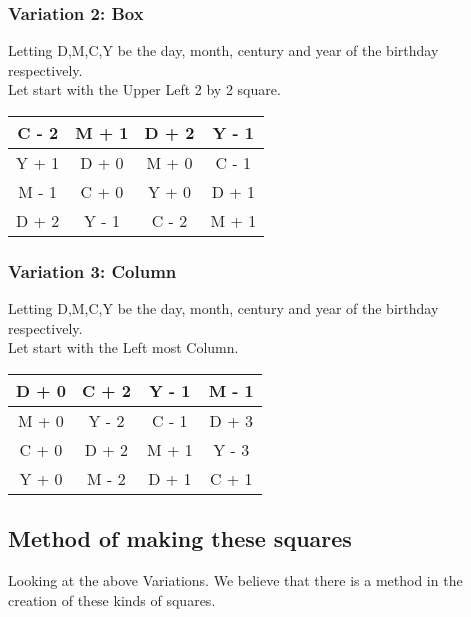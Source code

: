 \documentclass{article}
\begin{document}
    \subsubsection{Variation 2: Box}
        Letting D,M,C,Y be the day, month, century and year of the birthday respectively. \\
        Let start with the Upper Left 2 by 2 square. \\
        \def\arraystretch{2}
        \begin{center}
            \begin{tabular}{|c|c|c|c|}
                \hline
                C - 2 & M + 1 & D + 2 & Y - 1 \\
                \hline
                Y + 1 & D + 0 & M + 0 & C - 1 \\
                \hline
                M - 1 & C + 0 & Y + 0 & D + 1 \\
                \hline
                D + 2 & Y - 1 & C - 2 & M + 1 \\
                \hline
            \end{tabular}
        \end{center}
        
        
    \subsubsection{Variation 3: Column}
        Letting D,M,C,Y be the day, month, century and year of the birthday respectively. \\
        Let start with the Left most Column. \\
        
        \def\arraystretch{2}
        \begin{center}
            \begin{tabular}{|c|c|c|c|}
                \hline
                D + 0 & C + 2 & Y - 1 & M - 1 \\
                \hline
                M + 0 & Y - 2 & C - 1 & D + 3 \\
                \hline
                C + 0 & D + 2 & M + 1 & Y - 3 \\
                \hline
                Y + 0 & M - 2 & D + 1 & C + 1 \\
                \hline
            \end{tabular}
        \end{center}
        
    \subsection{Method of making these squares}
        Looking at the above Variations. We believe that there is a method in the creation of these kinds of squares.
        
\end{document}

